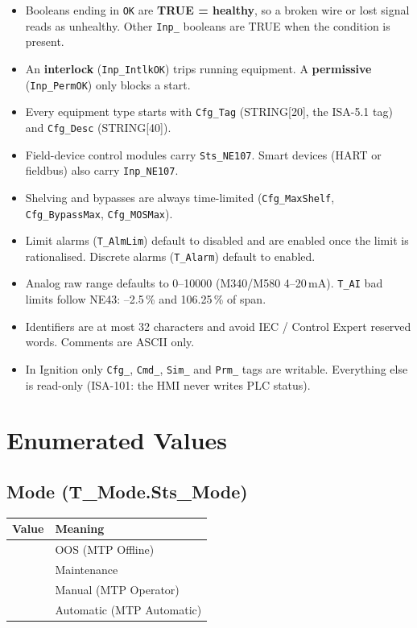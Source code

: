\begin{itemize}[itemsep=2pt]
  \item Booleans ending in \texttt{OK} are \textbf{TRUE = healthy}, so a broken wire or lost signal reads as unhealthy. Other \texttt{Inp\_} booleans are TRUE when the condition is present.
  \item An \textbf{interlock} (\texttt{Inp\_IntlkOK}) trips running equipment. A \textbf{permissive} (\texttt{Inp\_PermOK}) only blocks a start.
  \item Every equipment type starts with \texttt{Cfg\_Tag} (STRING[20], the ISA-5.1 tag) and \texttt{Cfg\_Desc} (STRING[40]).
  \item Field-device control modules carry \texttt{Sts\_NE107}. Smart devices (HART or fieldbus) also carry \texttt{Inp\_NE107}.
  \item Shelving and bypasses are always time-limited (\texttt{Cfg\_MaxShelf}, \texttt{Cfg\_BypassMax}, \texttt{Cfg\_MOSMax}).
  \item Limit alarms (\texttt{T\_AlmLim}) default to disabled and are enabled once the limit is rationalised. Discrete alarms (\texttt{T\_Alarm}) default to enabled.
  \item Analog raw range defaults to 0--10000 (M340/\allowbreak{}M580 4--20\,mA). \texttt{T\_AI} bad limits follow NE43: --2.5\,\% and 106.25\,\% of span.
  \item Identifiers are at most 32 characters and avoid IEC /\allowbreak{} Control Expert reserved words. Comments are ASCII only.
  \item In Ignition only \texttt{Cfg\_}, \texttt{Cmd\_}, \texttt{Sim\_} and \texttt{Prm\_} tags are writable. Everything else is read-only (ISA-101: the HMI never writes PLC status).
\end{itemize}

\section{Enumerated Values}
\label{app:pclib:enums}
\subsection*{Mode (T\_Mode.Sts\_Mode)}
{\small
\begin{longtable}{@{}>{\raggedright\arraybackslash}p{1.4cm}>{\raggedright\arraybackslash}p{13.0cm}@{}}
\toprule
\rowcolor{tblhead}\textbf{Value} & \textbf{Meaning} \\
\midrule
\endhead
0 & OOS (MTP Offline) \\
1 & Maintenance \\
2 & Manual (MTP Operator) \\
3 & Automatic (MTP Automatic) \\
\bottomrule
\end{longtable}
}
